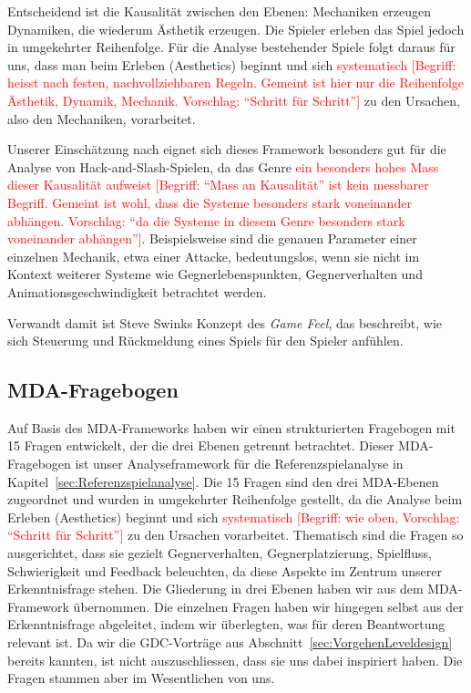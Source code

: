 \documentclass[../Main.tex]{subfiles}
\begin{document}
Entscheidend ist die Kausalität zwischen den Ebenen: Mechaniken erzeugen Dynamiken, die wiederum Ästhetik erzeugen. Die Spieler erleben das Spiel jedoch in umgekehrter Reihenfolge.\autocite[2]{hunicke2004mda} Für die Analyse bestehender Spiele folgt daraus für uns, dass man beim Erleben (Aesthetics) beginnt und sich \textcolor{red}{systematisch [Begriff: heisst nach festen, nachvollziehbaren Regeln. Gemeint ist hier nur die Reihenfolge Ästhetik, Dynamik, Mechanik. Vorschlag: \enquote{Schritt für Schritt}]} zu den Ursachen, also den Mechaniken, vorarbeitet.

Unserer Einschätzung nach eignet sich dieses Framework besonders gut für die Analyse von Hack-and-Slash-Spielen, da das Genre \textcolor{red}{ein besonders hohes Mass dieser Kausalität aufweist [Begriff: \enquote{Mass an Kausalität} ist kein messbarer Begriff. Gemeint ist wohl, dass die Systeme besonders stark voneinander abhängen. Vorschlag: \enquote{da die Systeme in diesem Genre besonders stark voneinander abhängen}]}. Beispielsweise sind die genauen Parameter einer einzelnen Mechanik, etwa einer Attacke, bedeutungslos, wenn sie nicht im Kontext weiterer Systeme wie Gegnerlebenspunkten, Gegnerverhalten und Animationsgeschwindigkeit betrachtet werden.

Verwandt damit ist Steve Swinks Konzept des \textit{Game Feel}, das beschreibt, wie sich Steuerung und Rückmeldung eines Spiels für den Spieler anfühlen.\autocite[1--6]{swink2008gamefeel}

\subsection{MDA-Fragebogen} \label{sec:Analysefragebogen}

Auf Basis des MDA-Frameworks haben wir einen strukturierten Fragebogen mit 15 Fragen entwickelt, der die drei Ebenen getrennt betrachtet. Dieser MDA-Fragebogen ist unser Analyseframework für die Referenzspielanalyse in Kapitel~\ref{sec:Referenzspielanalyse}. Die 15 Fragen sind den drei MDA-Ebenen zugeordnet und wurden in umgekehrter Reihenfolge gestellt, da die Analyse beim Erleben (Aesthetics) beginnt und sich \textcolor{red}{systematisch [Begriff: wie oben, Vorschlag: \enquote{Schritt für Schritt}]} zu den Ursachen vorarbeitet. Thematisch sind die Fragen so ausgerichtet, dass sie gezielt Gegnerverhalten, Gegnerplatzierung, Spielfluss, Schwierigkeit und Feedback beleuchten, da diese Aspekte im Zentrum unserer Erkenntnisfrage stehen. Die Gliederung in drei Ebenen haben wir aus dem MDA-Framework übernommen.\autocite{hunicke2004mda} Die einzelnen Fragen haben wir hingegen selbst aus der Erkenntnisfrage abgeleitet, indem wir überlegten, was für deren Beantwortung relevant ist. Da wir die GDC-Vorträge aus Abschnitt~\ref{sec:VorgehenLeveldesign} bereits kannten, ist nicht auszuschliessen, dass sie uns dabei inspiriert haben. Die Fragen stammen aber im Wesentlichen von uns.
\end{document}
